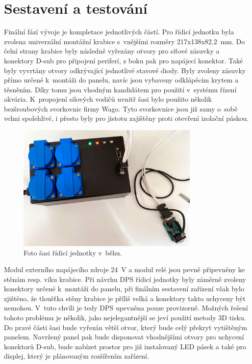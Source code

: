 \chapter{Sestavení a testování}

Finální fází vývoje je kompletace jednotlivých částí. Pro řídicí jednotku byla zvolena univerzální montážní krabice s~vnějšími rozměry 217x138x\qty{82.2}{mm}. Do čelní strany krabice byly následně vyřezány otvory pro síťové zásuvky a konektory D-sub pro připojení periferí, z boku pak pro napájecí konektor. Také byly vyvrtány otvory odkrývající jednotlivé stavové diody. Byly zvoleny zásuvky přímo určené k~montáži do panelu, navíc jsou vybaveny odklápěcím krytem a těsněním. Díky tomu jsou vhodným kandidátem pro použití v~systému řízení akvária. K~propojení silových vodičů uvnitř šasi bylo použito několik bezšroubových svorkovnic firmy Wago. Tyto svorkovnice jsou již samy o~sobě velmi spolehlivé, i přesto byly pro jistotu zajištěny proti otevření izolační páskou. 

\begin{figure}[h!]
    \centering
    \includegraphics[width=0.8\textwidth]{obrazky/foto/zarizeni_beh.jpeg}
    \caption{Foto šasi řídicí jednotky v~běhu.}
    \label{fig:obrazky-foto-zarizeni_beh-jpeg}
\end{figure}

Modul externího napájecího zdroje \qty{24}{V} a modul relé jsou pevně připevněny ke stěnám resp. víku krabice. Při návrhu DPS řídicí jednotky byly záměrně zvoleny konektory určené k~montáži do panelu, při finálním sestavení zařízení však bylo zjištěno, že tloušťka stěny krabice je příliš velká a konektory takto uchyceny být nemohou. V~tuto chvíli je tedy DPS upevněna pouze provizorně. Možných řešení tohoto problému je několik, jako nejelegantnější se jeví použití metody 3D tisku. Do pravé části šasi bude vyřezán větší otvor, který bude celý překryt vytištěným panelem. Navržený panel pak bude disponovat vhodnějšími otvory pro uchycení konektorů D-sub, bude nabízet prostor pro již instalovaný LED pásek a také pro displej, který je plánovaným rozšířením zařízení.  

